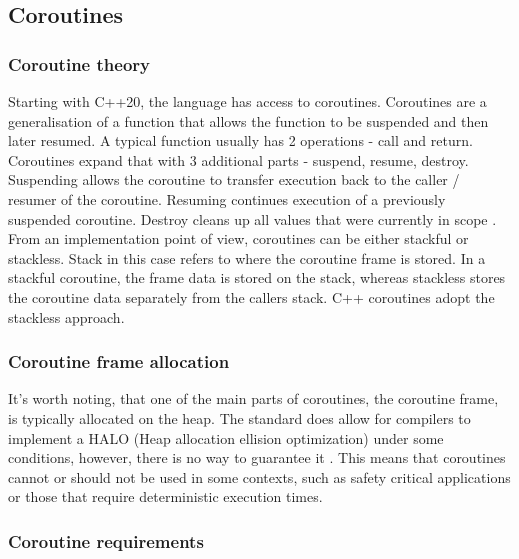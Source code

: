 \documentclass[
    english, %
]{VUMIFPSkursinis}
\begin{document}

\FloatBarrier
\subsection{Coroutines}

\FloatBarrier
\subsubsection{Coroutine theory}

Starting with C++20, the language has access to coroutines. Coroutines are a generalisation of a 
function that allows the function to be suspended and then later resumed. A typical function usually has
2 operations - call and return. Coroutines expand that with 3 additional parts - suspend, resume, destroy.
Suspending allows the coroutine to transfer execution back to the caller / resumer of the coroutine. Resuming
continues execution of a previously suspended coroutine. Destroy cleans up all values that were currently in scope \cite{CoroutineTheory}.
From an implementation point of view, coroutines can be either stackful or stackless. Stack in this case
refers to where the coroutine frame is stored. In a stackful coroutine, the frame data is stored
on the stack, whereas stackless stores the coroutine data separately from the callers stack.
C++ coroutines adopt the stackless approach.

\FloatBarrier
\subsubsection{Coroutine frame allocation}

It's worth noting, that one of the main parts of coroutines, the coroutine frame, is typically allocated on the heap. The standard does 
allow for compilers to implement a HALO (Heap allocation ellision optimization) under some conditions, however, there is no way to guarantee it \cite{CoroHALO}.
This means that coroutines cannot or should not be used in some contexts, such as safety critical applications or those that require
deterministic execution times.

\FloatBarrier
\subsubsection{Coroutine requirements}
\end{document}
